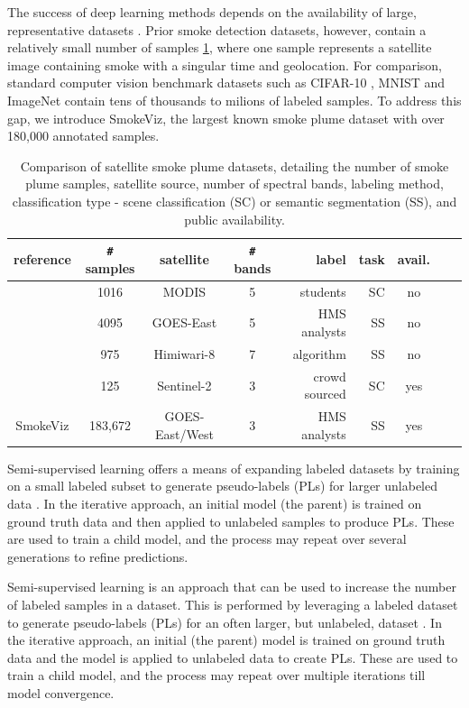\documentclass{article}
\begin{document}
The success of deep learning methods depends on the availability of large, representative datasets \cite{data_size}. Prior smoke detection datasets, however, contain a relatively small number of samples \ref{studies}, where one sample represents a satellite image containing smoke with a singular time and geolocation. For comparison, standard computer vision benchmark datasets such as CIFAR-10 \cite{cifar}, MNIST \cite{mnist} and ImageNet \cite{imgnet} contain tens of thousands to milions of labeled samples. To address this gap, we introduce SmokeViz, the largest known smoke plume dataset with over 180,000 annotated samples.


\begin{table}[h]
    \caption{Comparison of satellite smoke plume datasets, detailing the number of smoke plume samples, satellite source, number of spectral bands, labeling method, classification type - scene classification (SC) or semantic segmentation (SS), and public availability.}\label{studies}
    \centering
    \begin{tabular}{ccccrrcrc}
        \toprule
        reference & \verb|#| samples & satellite & \verb|#| bands & label & task & avail.\\
        \midrule
        \cite{smokenet}& 1016 & MODIS & 5 & students & SC & no \\
        \cite{smoke_goes}& 4095 & GOES-East & 5 & HMS analysts & SS & no \\
        \cite{larsen} & 975 & Himiwari-8 & 7 & algorithm& SS & no \\
        \cite{satlas} & 125 & Sentinel-2 & 3 & crowd sourced & SC & yes \\
        SmokeViz  & 183,672 & GOES-East/West & 3 & HMS analysts & SS & yes \\
        \bottomrule
    \end{tabular}
\end{table}


Semi-supervised learning offers a means of expanding labeled datasets by training on a small labeled subset to generate pseudo-labels (PLs) for larger unlabeled data \cite{pseudo}. In the iterative approach, an initial model (the parent) is trained on ground truth data and then applied to unlabeled samples to produce PLs. These are used to train a child model, and the process may repeat over several generations to refine predictions.

Semi-supervised learning is an approach that can be used to increase the number of labeled samples in a dataset. This is performed by leveraging a labeled dataset to generate pseudo-labels (PLs) for an often larger, but unlabeled, dataset \cite{pseudo}. In the iterative approach, an initial (the parent) model is trained on ground truth data and the model is applied to unlabeled data to create PLs. These are used to train a child model, and the process may repeat over multiple iterations till model convergence. 
\end{document}
